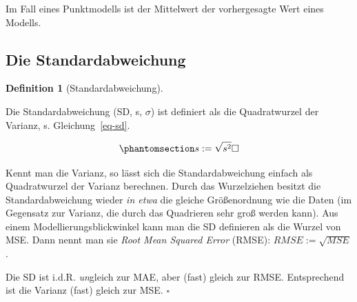 \documentclass[
  letterpaper,
  twoside,
  open=any]{scrbook}
\theoremstyle{definition}
\newtheorem{definition}{Definition}[chapter]
\theoremstyle{definition}
\theoremstyle{definition}
\theoremstyle{remark}
\begin{document}
Im Fall eines Punktmodells ist der Mittelwert der vorhergesagte Wert
eines Modells.

\subsection{Die Standardabweichung}\label{die-standardabweichung}

\begin{definition}[Standardabweichung]\protect\hypertarget{def-sd}{}\label{def-sd}

Die Standardabweichung (SD, s, \(\sigma\)) ist definiert als die
Quadratwurzel der Varianz, s. Gleichung~\ref{eq-sd}.

\begin{equation}\phantomsection\label{eq-sd}{s := \sqrt{s^2} \square}\end{equation}

\end{definition}

Kennt man die Varianz, so lässt sich die Standardabweichung einfach als
Quadratwurzel der Varianz berechnen. Durch das Wurzelziehen besitzt die
Standardabweichung wieder \emph{in etwa} die gleiche Größenordnung wie
die Daten (im Gegensatz zur Varianz, die durch das Quadrieren sehr groß
werden kann). Aus einem Modellierungsblickwinkel kann man die SD
definieren als die Wurzel von MSE. Dann nennt man sie \emph{Root Mean
Squared Error} (RMSE): \(RMSE := \sqrt{MSE}\).

\begin{tcolorbox}[enhanced jigsaw, colbacktitle=quarto-callout-note-color!10!white, colframe=quarto-callout-note-color-frame, coltitle=black, arc=.35mm, breakable, opacitybacktitle=0.6, toprule=.15mm, colback=white, rightrule=.15mm, opacityback=0, toptitle=1mm, title=\textcolor{quarto-callout-note-color}{\faInfo}\hspace{0.5em}{Hinweis}, titlerule=0mm, bottomtitle=1mm, bottomrule=.15mm, leftrule=.75mm, left=2mm]

Die SD ist i.d.R. \emph{un}gleich zur MAE, aber (fast) gleich zur RMSE.
Entsprechend ist die Varianz (fast) gleich zur MSE. \(\square\)

\end{tcolorbox}
\end{document}
